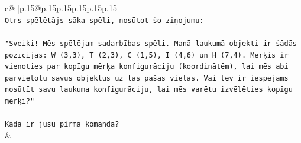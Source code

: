 \documentclass{article}
\begin{document}
{\begin{supertabular}{c@{$\;$}|p{.15\linewidth}@{}p{.15\linewidth}p{.15\linewidth}p{.15\linewidth}p{.15\linewidth}p{.15\linewidth}}
{{{\\ 
\texttt{Otrs spēlētājs sāka spēli, nosūtot šo ziņojumu:} \\
\\ 
\texttt{"Sveiki! Mēs spēlējam sadarbības spēli. Manā laukumā objekti ir šādās pozīcijās: W (3,3), T (2,3), C (1,5), I (4,6) un H (7,4). Mērķis ir vienoties par kopīgu mērķa konfigurāciju (koordinātēm), lai mēs abi pārvietotu savus objektus uz tās pašas vietas. Vai tev ir iespējams nosūtīt savu laukuma konfigurāciju, lai mēs varētu izvēlēties kopīgu mērķi?"} \\
\\ 
\texttt{Kāda ir jūsu pirmā komanda?} \\
            }
        }
    }
    & \\ \\


\end{supertabular}}
\end{document}
